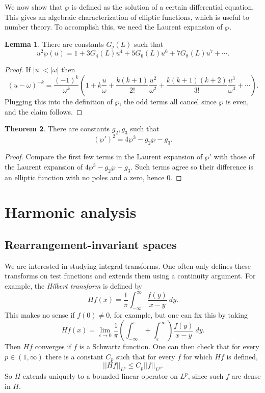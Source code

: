 \documentclass[12pt]{report}
\newcommand{\dfn}[1]{\emph{#1}\index{#1}}
\theoremstyle{definition}
\newtheorem{theorem}{Theorem}[chapter]
\newtheorem{lemma}[theorem]{Lemma}
\begin{document}
We now show that $\wp$ is defined as the solution of a certain differential equation.
This gives an algebraic characterization of elliptic functions, which is useful to number theory.
To accomplish this, we need the Laurent expansion of $\wp$.
\begin{lemma}
There are constants $G_j(L)$ such that
$$u^2\wp(u) = 1 + 3G_4(L)u^4 + 5G_6(L)u^6 + 7G_8(L)u^7 + \cdots.$$
\end{lemma}
\begin{proof}
If $|u| < |\omega|$ then
$$(u - \omega)^{-k} = \frac{(-1)^k}{\omega^k}\left(1 + k\frac{u}{\omega} + \frac{k(k+1)}{2!} \frac{u^2}{\omega^2} + \frac{k(k+1)(k+2)}{3!}\frac{u^3}{\omega^3} + \cdots\right).$$
Plugging this into the definition of $\wp$, the odd terms all cancel since $\wp$ is even, and the claim follows.
\end{proof}
\begin{theorem}
There are constants $g_2,g_3$ such that
$$(\wp')^2 = 4\wp^3 - g_2\wp - g_3.$$
\end{theorem}
\begin{proof}
Compare the first few terms in the Laurent expansion of $\wp'$ with those of the Laurent expansion of $4\wp^3 - g_2\wp - g_3$.
Such terms agree so their difference is an elliptic function with no poles and a zero, hence $0$.
\end{proof}





\part{Harmonic analysis}
\chapter{Rearrangement-invariant spaces}
We are interested in studying integral transforms. One often only defines these transforms on test functions and extends them using a continuity argument. For example, the \dfn{Hilbert transform} is defined by
$$Hf(x) = \frac{1}{\pi}\int_{-\infty}^\infty \frac{f(y)}{x-y}~dy.$$
This makes no sense if $f(0) \neq 0$, for example, but one can fix this by taking
$$Hf(x) = \lim_{\varepsilon \to 0} \frac{1}{\pi} \left(\int_{-\infty}^\varepsilon + \int_\varepsilon^\infty\right) \frac{f(y)}{x-y}~dy.$$
Then $Hf$ converges if $f$ is a Schwartz function. One can then check that for every $p \in (1, \infty)$ there is a constant $C_p$ such that for every $f$ for which $Hf$ is defined,
$$||Hf||_{L^p} \leq C_p ||f||_{L^p}.$$
So $H$ extends uniquely to a bounded linear operator on $L^p$, since such $f$ are dense in $H$.
\end{document}
